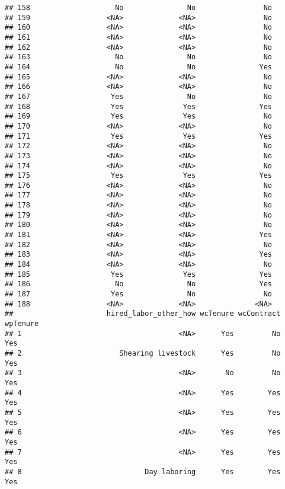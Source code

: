 \documentclass[
]{article}
\begin{document}
\begin{verbatim}
## 158                    No               No                No
## 159                  <NA>             <NA>                No
## 160                  <NA>             <NA>                No
## 161                  <NA>             <NA>                No
## 162                  <NA>             <NA>                No
## 163                    No               No                No
## 164                    No               No               Yes
## 165                  <NA>             <NA>                No
## 166                  <NA>             <NA>                No
## 167                   Yes               No                No
## 168                   Yes              Yes               Yes
## 169                   Yes              Yes                No
## 170                  <NA>             <NA>                No
## 171                   Yes              Yes               Yes
## 172                  <NA>             <NA>                No
## 173                  <NA>             <NA>                No
## 174                  <NA>             <NA>                No
## 175                   Yes              Yes               Yes
## 176                  <NA>             <NA>                No
## 177                  <NA>             <NA>                No
## 178                  <NA>             <NA>                No
## 179                  <NA>             <NA>                No
## 180                  <NA>             <NA>                No
## 181                  <NA>             <NA>               Yes
## 182                  <NA>             <NA>                No
## 183                  <NA>             <NA>               Yes
## 184                  <NA>             <NA>                No
## 185                   Yes              Yes               Yes
## 186                    No               No               Yes
## 187                   Yes               No                No
## 188                  <NA>             <NA>              <NA>
##                      hired_labor_other_how wcTenure wcContract wpTenure
## 1                                     <NA>      Yes         No      Yes
## 2                       Shearing livestock      Yes         No      Yes
## 3                                     <NA>       No         No      Yes
## 4                                     <NA>      Yes        Yes      Yes
## 5                                     <NA>      Yes        Yes      Yes
## 6                                     <NA>      Yes        Yes      Yes
## 7                                     <NA>      Yes        Yes      Yes
## 8                             Day laboring      Yes        Yes      Yes

\end{verbatim}
\end{document}
